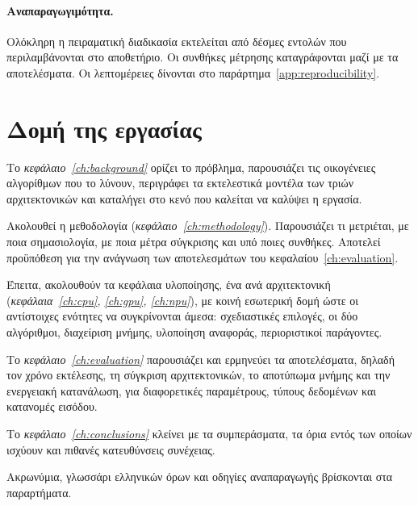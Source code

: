\paragraph{Αναπαραγωγιμότητα.} Ολόκληρη η πειραματική διαδικασία εκτελείται από
δέσμες εντολών που περιλαμβάνονται στο αποθετήριο. Οι συνθήκες μέτρησης
καταγράφονται μαζί με τα αποτελέσματα. Οι λεπτομέρειες δίνονται στο
παράρτημα~\ref{app:reproducibility}.

\section{Δομή της εργασίας}
\label{sec:intro-outline}

Το \emph{κεφάλαιο~\ref{ch:background}} ορίζει το πρόβλημα, παρουσιάζει τις
οικογένειες αλγορίθμων που το λύνουν, περιγράφει τα εκτελεστικά μοντέλα των
τριών αρχιτεκτονικών και καταλήγει στο κενό που καλείται να καλύψει η εργασία.

Ακολουθεί η μεθοδολογία (\emph{κεφάλαιο~\ref{ch:methodology}}). Παρουσιάζει τι
μετριέται, με ποια σημασιολογία, με ποια μέτρα σύγκρισης και υπό ποιες
συνθήκες. Αποτελεί προϋπόθεση για την ανάγνωση των αποτελεσμάτων του
κεφαλαίου~\ref{ch:evaluation}.

Έπειτα, ακολουθούν τα κεφάλαια υλοποίησης, ένα ανά αρχιτεκτονική
(\emph{κεφάλαια~\ref{ch:cpu}, \ref{ch:gpu}, \ref{ch:npu}}), με κοινή εσωτερική
δομή ώστε οι αντίστοιχες ενότητες να συγκρίνονται άμεσα: σχεδιαστικές επιλογές,
οι δύο αλγόριθμοι, διαχείριση μνήμης, υλοποίηση αναφοράς, περιοριστικοί
παράγοντες.

Το \emph{κεφάλαιο~\ref{ch:evaluation}} παρουσιάζει και ερμηνεύει τα
αποτελέσματα, δηλαδή τον χρόνο εκτέλεσης, τη σύγκριση αρχιτεκτονικών, το
αποτύπωμα μνήμης και την ενεργειακή κατανάλωση, για διαφορετικές παραμέτρους,
τύπους δεδομένων και κατανομές εισόδου.

Το \emph{κεφάλαιο~\ref{ch:conclusions}} κλείνει με τα συμπεράσματα, τα όρια
εντός των οποίων ισχύουν και πιθανές κατευθύνσεις συνέχειας.

Ακρωνύμια, γλωσσάρι ελληνικών όρων και οδηγίες αναπαραγωγής βρίσκονται στα
παραρτήματα.
